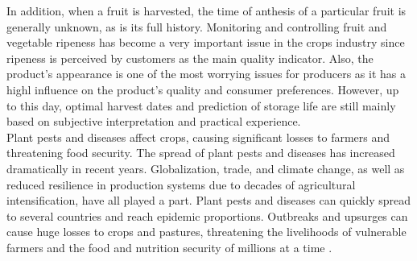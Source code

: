 In addition, when a fruit is harvested, the time of anthesis of a particular fruit is 
generally unknown, as is its full history. Monitoring and controlling fruit and vegetable 
ripeness has become a very important issue in the crops industry since ripeness is perceived 
by customers as the main quality indicator. Also, the product's appearance is one of the most 
worrying issues for producers as it has a highl influence on the product's quality 
and consumer preferences. However, up to this day, optimal harvest dates and 
prediction of storage life are still mainly based on subjective interpretation 
and practical experience. \\

Plant pests and diseases affect crops, causing significant losses to farmers 
and threatening food security. The spread of plant pests and diseases has 
increased dramatically in recent years. Globalization, trade, and climate 
change, as well as reduced resilience in production systems due to decades 
of agricultural intensification, have all played a part. Plant pests and 
diseases can quickly spread to several countries and reach epidemic proportions. 
Outbreaks and upsurges can cause huge losses to crops and pastures, threatening 
the livelihoods of vulnerable farmers and the food and nutrition security of 
millions at a time \cite{dir19}. \\[5pt]

